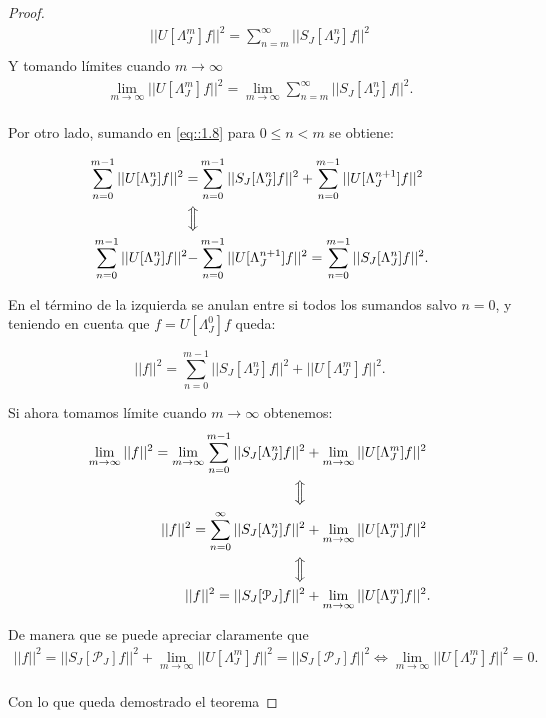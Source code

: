 \begin{proof}
  \begin{align*}
    ||U[\Lambda_J^m]f||^2 =\sum_{n=m}^\infty ||S_J[\Lambda_J^n]f||^2  \\
  \end{align*}
  \noindent Y tomando límites cuando $m\rightarrow \infty$
  \begin{align*}
    \lim_{m\rightarrow \infty}||U[\Lambda_J^m]f||^2 =\lim_{m\rightarrow \infty}\sum_{n=m}^\infty ||S_J[\Lambda_J^n]f||^2.  \\
  \end{align*}

  \medskip

  \noindent Por otro lado, sumando en \eqref{eq::1.8} para $0\leq n < m$ se obtiene:

  \begin{align*}
    \sum_{n=0}^{m-1} ||U[\Lambda_J^n]f||^2=&\sum_{n=0}^{m-1} ||S_J[\Lambda_J^n]f||^2 +\sum_{n=0}^{m-1}||U[\Lambda_J^{n+1}]f||^2 \\
    \Big\Updownarrow \\
    \sum_{n=0}^{m-1} ||U[\Lambda_J^n]f||^2 -& \sum_{n=0}^{m-1}||U[\Lambda_J^{n+1}]f||^2 = \sum_{n=0}^{m-1} ||S_J[\Lambda_J^n]f||^2.  \\
  \end{align*}
  
  \noindent En el término de la izquierda se anulan entre si todos los sumandos salvo $n=0$, y teniendo en cuenta que $f=U[\Lambda_J^0]f$ queda:
  
  \begin{equation}
    ||f||^2=\sum_{n=0}^{m-1} ||S_J[\Lambda_J^n]f||^2 + ||U[\Lambda_J^m]f||^2.
  \end{equation}

  \noindent Si ahora tomamos límite cuando $m\rightarrow \infty$ obtenemos: 
  \begin{align*}
    \lim_{m\rightarrow \infty}||f||^2 =\lim_{m\rightarrow \infty}\sum_{n=0}^{m-1} ||S_J[\Lambda_J^n]f||^2 &+ \lim_{m\rightarrow \infty} ||U[\Lambda_J^m]f||^2  \\
    \Big\Updownarrow \\
    ||f||^2 =\sum_{n=0}^{\infty} ||S_J[\Lambda_J^n]f||^2 &+ \lim_{m\rightarrow \infty} ||U[\Lambda_J^m]f||^2  \\
    \Big\Updownarrow \\
    ||f||^2 =||S_J[\mathcal{P}_J]f||^2 &+ \lim_{m\rightarrow \infty} ||U[\Lambda_J^m]f||^2.  \\
  \end{align*}

  \noindent De manera que se puede apreciar claramente que  
  \begin{align*}
    ||f||^2 =||S_J[\mathcal{P}_J]f||^2 + \lim_{m\rightarrow \infty} ||U[\Lambda_J^m]f||^2  = ||S_J[\mathcal{P}_J]f||^2 \iff \lim_{m\rightarrow \infty} ||U[\Lambda_J^m]f||^2=0. \\
  \end{align*}

  \noindent Con lo que queda demostrado el teorema \qedhere
\end{proof}

